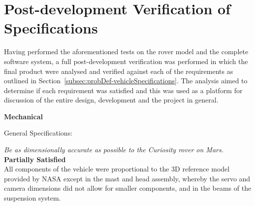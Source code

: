 \section{Post-development Verification of Specifications}
  Having performed the aforementioned tests on the rover model and the complete software system, a full post-development verification was performed in which the final product were analysed and verified against each of the requirements as outlined in Section~\ref{subsec:probDef-vehicleSpecifications}. The analysis aimed to determine if each requirement was satisfied and this was used as a platform for discussion of the entire design, development and the project in general.
  
  \begin{itemize}
    \item \textbf{Mechanical}
    \begin{RM}
      \item General Specifications:
      \begin{RM}
        \item \textit{Be as dimensionally accurate as possible to the \textit{Curiosity} rover on Mars.}\\
        \textbf{Partially Satisfied}\\
        All components of the vehicle were proportional to the 3D reference model \cite{nasa3Dprint} provided by NASA except in the mast and head assembly, whereby the servo and camera dimensions did not allow for smaller components, and in the beams of the suspension system.
        

\end{RM}
\end{RM}
\end{itemize}
